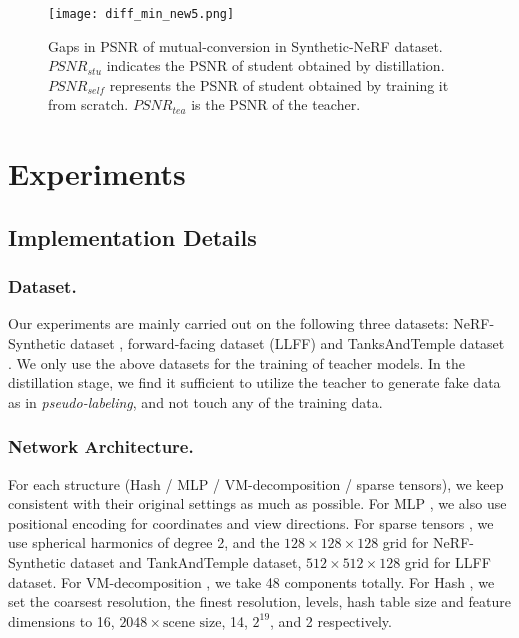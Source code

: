 \documentclass[letterpaper]{article} \usepackage{aaai23}  \usepackage{times}  \usepackage{helvet}  \usepackage{courier}  \usepackage[hyphens]{url}  \usepackage{graphicx} \urlstyle{rm} \def\UrlFont{\rm}  \usepackage{natbib}  \usepackage{caption} \frenchspacing  \setlength{\pdfpagewidth}{8.5in}  \setlength{\pdfpageheight}{11in}  \usepackage{multirow}
\begin{document}
\begin{figure}[t]
\centering
\texttt{[image: diff\_min\_new5.png]} \caption{Gaps in PSNR of mutual-conversion in Synthetic-NeRF dataset. $PSNR_{stu}$ indicates the PSNR of student obtained by distillation. $PSNR_{self}$ represents the PSNR of student obtained by training it from scratch. $PSNR_{tea}$ is the PSNR of the teacher.}
\label{fig-heatmap}
\end{figure}
\section{Experiments}
\subsection{Implementation Details}
\subsubsection{Dataset.}Our experiments are mainly carried out on the following three datasets: NeRF-Synthetic dataset  \cite{mildenhall2020NeRF}, forward-facing dataset (LLFF) \cite{mildenhall2019llff} and TanksAndTemple dataset \cite{knapitsch2017tanks}. We only use the above datasets for the training of teacher models. In the distillation stage, we find it sufficient to utilize the teacher to generate fake data as in \textit{pseudo-labeling}, and not touch any of the training data.
\subsubsection{Network Architecture.}
For each structure (Hash / MLP / VM-decomposition / sparse tensors), we keep consistent with their original settings as much as possible. For MLP \cite{lin2020NeRFpytorch}, we also use positional encoding for coordinates and view directions. For sparse tensors \cite{fridovich2022plenoxels}, we use spherical harmonics of degree 2, and the $128\times128\times128$ grid for NeRF-Synthetic dataset and TankAndTemple dataset, $512\times512\times128$ grid for LLFF dataset. For VM-decomposition \cite{chen2022tensorf}, we take 48 components totally. For Hash \cite{muller2022instant}, we set the coarsest resolution, the finest resolution, levels, hash table size and feature dimensions to 16, $2048 \times \text{scene size}$, 14, $2^{19}$, and 2 respectively. 
\end{document}
